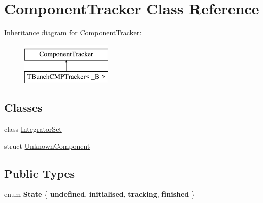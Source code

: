 \hypertarget{classComponentTracker}{}\section{Component\+Tracker Class Reference}
\label{classComponentTracker}
Inheritance diagram for Component\+Tracker\+:\begin{figure}[H]
\begin{center}
\leavevmode
\includegraphics[height=2.000000cm]{classComponentTracker}
\end{center}
\end{figure}
\subsection*{Classes}
\begin{DoxyCompactItemize}
\item 
class \hyperlink{classComponentTracker_1_1IntegratorSet}{Integrator\+Set}
\item 
struct \hyperlink{structComponentTracker_1_1UnknownComponent}{Unknown\+Component}
\end{DoxyCompactItemize}
\subsection*{Public Types}
\begin{DoxyCompactItemize}
\item 
\mbox{\label{classComponentTracker_a7195e1d7493af8da99857479953b088d}} 
enum {\bfseries State} \{ {\bfseries undefined}, 
{\bfseries initialised}, 
{\bfseries tracking}, 
{\bfseries finished}
 \}
\end{DoxyCompactItemize}
